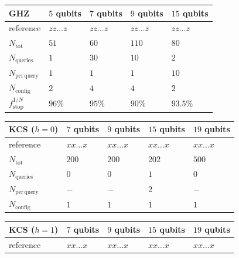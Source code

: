 \documentclass[pra,aps,showpacs,groupedaddress,superscriptaddress,twocolumn,toc=flat,biblatex,footinbib]{revtex4-1}
\begin{document}
\begin{table}[]
\begin{tabular}{p{1.91 cm}|p{1.3 cm}p{1.3 cm}p{1.3 cm}p{1.3 cm}}
\textbf{GHZ}                & $5$ qubits & $7$ qubits & $9$ qubits & $15$ qubits \\\hline
reference        &    $zz\dots z$      &       $zz\dots z$  &  $zz\dots z$        &    $zz\dots z$      \\
$N_{\mathrm{tot}}$        &    $51$      &       $60$   &  $110$        &    $80$       \\
$N_{\mathrm{queries}}$  & $1$         &    $30$      & $10$         &  $2$  \\  
$N_{\mathrm{per\, query}}$  & $1$         &    $1$      & $1$         &  $10$  \\  
$N_{\mathrm{config}}$  & $2$         &    $4$      & $4$         &  $2$ \\
$f^{1/N}_{\mathrm{stop}}$  & $96\%$         &    $95\%$      & $90\%$         &  $93.5\%$
\end{tabular}
\newline
\vspace*{0.2 cm}
\newline
\begin{tabular}{p{1.91 cm}|p{1.3 cm}p{1.3 cm}p{1.3 cm}p{1.3 cm}}
\textbf{KCS} ($h=0$)                & $7$ qubits & $9$ qubits & $15$ qubits & $19$ qubits \\\hline
reference        &    $xx\dots x$      &       $xx\dots x$  &  $xx\dots x$        &    $xx\dots x$      \\
$N_{\mathrm{tot}}$         &    $200$      &       $200$   &  $202$        &    $500$       \\
$N_{\mathrm{queries}}$  & $0$         &    $0$      & $1$  &  $0$   \\ 
$N_{\mathrm{per\, query}}$  & $-$         &    $-$      & $2$         &  $-$  \\ 
$N_{\mathrm{config}}$  & $1$         &    $1$      & $1$         &  $1$         
\end{tabular}
\newline
\vspace*{0.2 cm}
\newline
\begin{tabular}{p{1.91 cm}|p{1.3 cm}p{1.3 cm}p{1.3 cm}p{1.3 cm}}
\textbf{KCS} ($h=1$)                & $7$ qubits & $9$ qubits & $15$ qubits & $19$ qubits \\\hline
reference   &    $xx\dots x$      &       $xx\dots x$  &  $xx\dots x$        &    $xx\dots x$      \\

\end{tabular}
\end{table}
\end{document}
